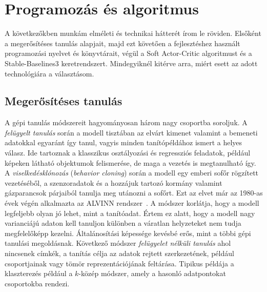\documentclass[a4paper,12pt,oneside]{article}
\begin{document}
\section{Programozás és algoritmus}
\label{sec:elmelet}

A következőkben munkám elméleti és technikai hátterét írom le röviden. Elsőként a
megerősítéses tanulás alapjait, majd ezt követően a fejlesztéshez használt
programozási nyelvet és könyvtárait, végül a Soft Actor-Critic algoritmust
és a Stable-Baselines3 keretrendszert. Mindegyiknél kitérve arra, miért
esett az adott technológiára a választásom.

\subsection{Megerősítéses tanulás}
\label{sec:rl}

A gépi tanulás módszereit hagyományosan három nagy csoportba soroljuk. A
\emph{felügyelt tanulás} során a modell tisztában az elvárt kimenet valamint a bemeneti adatokkal egyaránt így 
tanul, vagyis minden tanítópéldához ismert a helyes válasz. Ide tartoznak a klasszikus
osztályozási és regressziós feladatok, például képeken látható objektumok
felismerése, de maga a vezetés is megtanulható így. A
\emph{viselkedésklónozás} (\emph{behavior cloning}) során a modell egy emberi
sofőr rögzített vezetéséből, a szenzoradatok és a hozzájuk tartozó kormány valamint
gázparancsok párjaiból tanulja meg utánozni a sofőrt. Ezt az elvet már az 1980-as
évek végén alkalmazta az ALVINN rendszer~\cite{pomerleau1989alvinn}. A módszer korlátja, hogy a modell
legfeljebb olyan jó lehet, mint a tanítóadat. Értem ez alatt, hogy a modell nagy varianciájú adaton 
kell tanuljon különben a váratlan helyzeteket nem tudja megfelelőképp kezelni. Általánosítási képessége kevésbé erős, mint a 
többi gépi tanulási megoldásnak.
Következő módszer \emph{felügyelet nélküli tanulás} ahol nincsenek címkék, a tanítás célja az
adatok rejtett szerkezetének, például csoportjainak vagy tömör
reprezentációjának feltárása. Tipikus példája a klaszterezés például a
$k$-közép módszer, amely a hasonló adatpontokat csoportokba rendezi.
\end{document}
